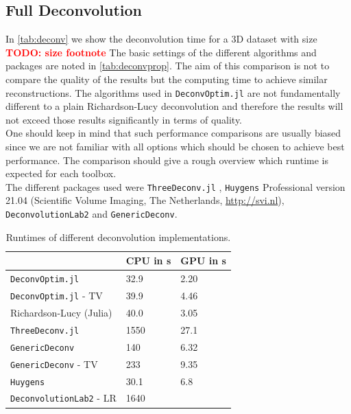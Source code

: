 \documentclass{juliacon}
\newcommand\todo[1]{\textcolor{red}{\textbf{TODO: #1}}}
\begin{document}
    \subsection{Full Deconvolution}
        In \autoref{tab:deconv} we show the deconvolution time for a 3D dataset with size \todo{size footnote} 
        The basic settings of the different algorithms and packages are noted in \autoref{tab:deconvprop}.
        The aim of this comparison is not to compare the quality of the results but the computing time to achieve similar reconstructions. 
        The algorithms used in \verb|DeconvOptim.jl| are not fundamentally different to a plain Richardson-Lucy deconvolution and therefore the results will 
        not exceed those results significantly in terms of quality.\\
        One should keep in mind that such performance comparisons are usually biased since we are not
        familiar with all options which should be chosen to achieve best performance.
        The comparison should give a rough overview which runtime is expected for each toolbox.\\
        The different packages used were \verb|ThreeDeconv.jl| \cite{ikoma2018convex}, \verb|Huygens| Professional version 21.04 (Scientific Volume Imaging, The Netherlands, \url{http://svi.nl}), \verb|DeconvolutionLab2| \cite{deconvlab2} and \verb|GenericDeconv|.  

        \begin{table}[h]
            \begin{tabular}{l l l}
                &  CPU in s& GPU in s\\ 
            \hline
            \verb|DeconvOptim.jl| & 32.9 & 2.20\\
            \verb|DeconvOptim.jl| - TV & 39.9 & 4.46 \\
            Richardson-Lucy (Julia) & 40.0 & 3.05 \\
            \verb|ThreeDeconv.jl|& 1550 & 27.1 \\
            \verb|GenericDeconv|  & 140 & 6.32\\
            \verb|GenericDeconv| - TV & 233 & 9.35 \\
            \verb|Huygens| & 30.1 & 6.8 \\
            \verb|DeconvolutionLab2| - LR& 1640 & \\
            \end{tabular}
            \caption{Runtimes of different deconvolution implementations.}
            \label{tab:deconv}
        \end{table}
\end{document}
